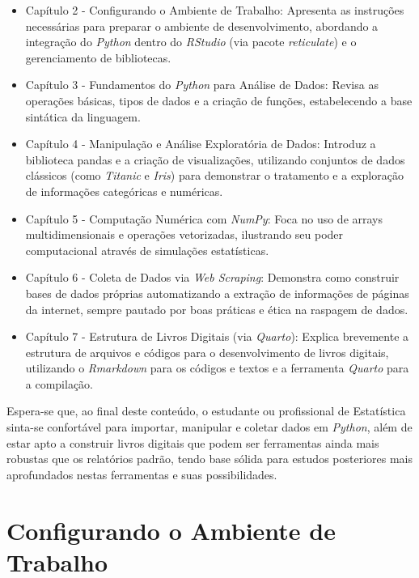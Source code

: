 \documentclass[
  brazilian,
  letterpaper,
  DIV=11,
  numbers=noendperiod]{scrreprt}
\begin{document}
\begin{itemize}
\item
  Capítulo 2 - Configurando o Ambiente de Trabalho: Apresenta as
  instruções necessárias para preparar o ambiente de desenvolvimento,
  abordando a integração do \emph{Python} dentro do \emph{RStudio} (via
  pacote \emph{reticulate}) e o gerenciamento de bibliotecas.
\item
  Capítulo 3 - Fundamentos do \emph{Python} para Análise de Dados:
  Revisa as operações básicas, tipos de dados e a criação de funções,
  estabelecendo a base sintática da linguagem.
\item
  Capítulo 4 - Manipulação e Análise Exploratória de Dados: Introduz a
  biblioteca pandas e a criação de visualizações, utilizando conjuntos
  de dados clássicos (como \emph{Titanic} e \emph{Iris}) para demonstrar
  o tratamento e a exploração de informações categóricas e numéricas.
\item
  Capítulo 5 - Computação Numérica com \emph{NumPy}: Foca no uso de
  arrays multidimensionais e operações vetorizadas, ilustrando seu poder
  computacional através de simulações estatísticas.
\item
  Capítulo 6 - Coleta de Dados via \emph{Web Scraping}: Demonstra como
  construir bases de dados próprias automatizando a extração de
  informações de páginas da internet, sempre pautado por boas práticas e
  ética na raspagem de dados.
\item
  Capítulo 7 - Estrutura de Livros Digitais (via \emph{Quarto}): Explica
  brevemente a estrutura de arquivos e códigos para o desenvolvimento de
  livros digitais, utilizando o \emph{Rmarkdown} para os códigos e
  textos e a ferramenta \emph{Quarto} para a compilação.
\end{itemize}

Espera-se que, ao final deste conteúdo, o estudante ou profissional de
Estatística sinta-se confortável para importar, manipular e coletar
dados em \emph{Python}, além de estar apto a construir livros digitais
que podem ser ferramentas ainda mais robustas que os relatórios padrão,
tendo base sólida para estudos posteriores mais aprofundados nestas
ferramentas e suas possibilidades.


\chapter{Configurando o Ambiente de
Trabalho}\label{configurando-o-ambiente-de-trabalho}
\end{document}
